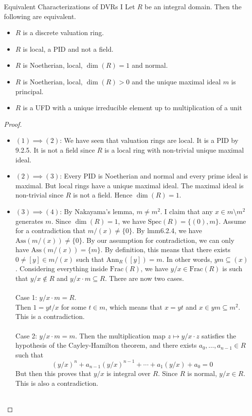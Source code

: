 \documentclass[a4paper]{article}
\begin{document}
\begin{prp}{Equivalent Characterizations of DVRs I}{} Let $R$ be an integral domain. Then the following are equivalent. 
\begin{itemize}
\item $R$ is a discrete valuation ring. 
\item $R$ is local, a PID and not a field. 
\item $R$ is Noetherian, local, $\dim(R)=1$ and normal. 
\item $R$ is Noetherian, local, $\dim(R)>0$ and the unique maximal ideal $m$ is principal. 
\item $R$ is a UFD with a unique irreducible element up to multiplication of a unit
\end{itemize} \tcbline
\begin{proof}~\\
\begin{itemize}
\item $(1)\implies(2)$: We have seen that valuation rings are local. It is a PID by 9.2.5. It is not a field since $R$ is a local ring with non-trivial unique maximal ideal. 
\item $(2)\implies(3)$: Every PID is Noetherian and normal and every prime ideal is maximal. But local rings have a unique maximal ideal. The maximal ideal is non-trivial since $R$ is not a field. Hence $\dim(R)=1$. 
\item $(3)\implies(4)$: By Nakayama's lemma, $m\neq m^2$. I claim that any $x\in m\setminus m^2$ generates $m$. Since $\dim(R)=1$, we have $\text{Spec}(R)=\{(0),m\}$. Assume for a contradiction that $m/(x)\neq\{0\}$. By lmm6.2.4, we have $\text{Ass}(m/(x))\neq\{0\}$. By our assumption for contradiction, we can only have $\text{Ass}(m/(x))=\{m\}$. By definition, this means that there exists $0\neq [y]\in m/(x)$ such that $\text{Ann}_R([y])=m$. In other words, $ym\subseteq(x)$. Considering everything inside $\text{Frac}(R)$, we have $y/x\in\text{Frac}(R)$ is such that $y/x\notin R$ and $y/x\cdot m\subseteq R$. There are now two cases. \\~\\

Case 1: $y/x\cdot m=R$. \\
Then $1=yt/x$ for some $t\in m$, which means that $x=yt$ and $x\in ym\subseteq m^2$. This is a contradiction. \\~\\

Case 2: $y/x\cdot m=m$. Then the multiplication map $z\mapsto y/x\cdot z$ satisfies the hypothesis of the Cayley-Hamilton theorem, and there exists $a_0,\dots,a_{n-1}\in R$ such that $$(y/x)^n+a_{n-1}(y/x)^{n-1}+\cdots+a_1(y/x)+a_0=0$$ But then this proves that $y/x$ is integral over $R$. Since $R$ is normal, $y/x\in R$. This is also a contradiction. \\~\\


\end{itemize}
\end{proof}
\end{prp}
\end{document}

